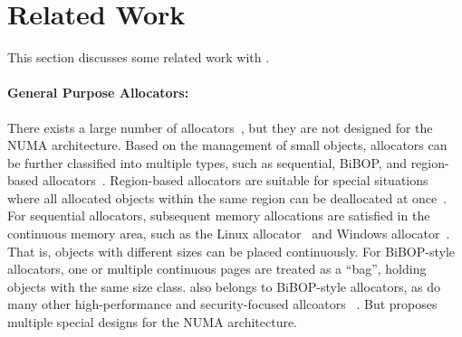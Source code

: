 \section{Related Work}

\label{sec:related}

This section discusses some related work with \NM{}. 

\paragraph{General Purpose Allocators:}
 There exists a large number of allocators~\cite{dlmalloc,Hoard,tcmalloc,jemalloc,Scalloc}, but they are not designed for the NUMA architecture. Based on the management of small objects, allocators can be further classified into multiple types, such as sequential, BiBOP, and region-based allocators~\cite{Gay:1998:MME:277650.277748,  DieHarder}. Region-based allocators are suitable for special situations where all allocated objects within the same region can be deallocated at once~\cite{Gay:1998:MME:277650.277748}. For sequential allocators, subsequent memory allocations are satisfied in the continuous memory area, such as the Linux allocator~\cite{dlmalloc} and Windows allocator~\cite{DieHarder}. That is, objects with different sizes can be placed continuously. For BiBOP-style allocators, one or multiple continuous pages are treated as a ``bag'', holding objects with the same size class. \NM{} also belongs to BiBOP-style allocators, as do many other high-performance and security-focused allcoators ~\cite{tcmalloc, jemalloc, Hoard, Scalloc, DieHarder}. But \NM{}
  proposes multiple special designs for the NUMA architecture.
 

